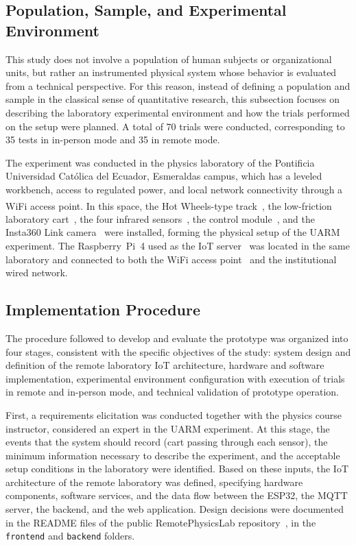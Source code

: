 \documentclass[sensors,article,submit,pdftex]{Definitions/mdpi}
\begin{document}
\subsection{Population, Sample, and Experimental Environment}

This study does not involve a population of human subjects or organizational units, but rather an instrumented physical system whose behavior is evaluated from a technical perspective. For this reason, instead of defining a population and sample in the classical sense of quantitative research, this subsection focuses on describing the laboratory experimental environment and how the trials performed on the setup were planned. A total of 70 trials were conducted, corresponding to 35 tests in in-person mode and 35 in remote mode.

The experiment was conducted in the physics laboratory of the Pontificia Universidad Cat\'olica del Ecuador, Esmeraldas campus, which has a leveled workbench, access to regulated power, and local network connectivity through a WiFi access point. In this space, the Hot Wheels\textsuperscript{\textregistered}-type track~\cite{r18}, the low-friction laboratory cart~\cite{r19}, the four infrared sensors~\cite{r20}, the control module~\cite{r21,r53}, and the Insta360 Link camera~\cite{r36} were installed, forming the physical setup of the UARM experiment. The Raspberry~Pi~4 used as the IoT server~\cite{r37} was located in the same laboratory and connected to both the WiFi access point~\cite{r32} and the institutional wired network.

\subsection{Implementation Procedure}

The procedure followed to develop and evaluate the prototype was organized into four stages, consistent with the specific objectives of the study: system design and definition of the remote laboratory IoT architecture, hardware and software implementation, experimental environment configuration with execution of trials in remote and in-person mode, and technical validation of prototype operation.

First, a requirements elicitation was conducted together with the physics course instructor, considered an expert in the UARM experiment. At this stage, the events that the system should record (cart passing through each sensor), the minimum information necessary to describe the experiment, and the acceptable setup conditions in the laboratory were identified. Based on these inputs, the IoT architecture of the remote laboratory was defined, specifying hardware components, software services, and the data flow between the ESP32, the MQTT server, the backend, and the web application. Design decisions were documented in the README files of the public RemotePhysicsLab repository~\cite{r15}, in the \texttt{frontend} and \texttt{backend} folders.
\end{document}
